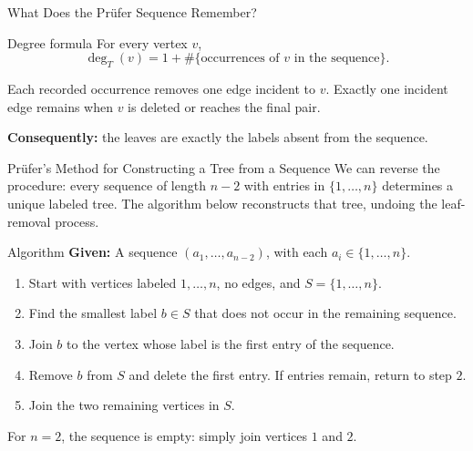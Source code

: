 \documentclass[aspectratio=169,11pt]{beamer}
\begin{document}
\begin{frame}{What Does the Pr\"ufer Sequence Remember?}
\large
\begin{block}{Degree formula}
For every vertex $v$,\[\deg_T(v)=1+\#\{\text{occurrences of }v\text{ in the sequence}\}.\]
\end{block}
Each recorded occurrence removes one edge incident to $v$. Exactly one incident edge remains when $v$ is deleted or reaches the final pair.\par\bigskip\textbf{Consequently:} the leaves are exactly the labels absent from the sequence.
\end{frame}

\begin{frame}{Pr\"ufer's Method for Constructing a Tree from a Sequence}
\normalsize
We can reverse the procedure: every sequence of length $n-2$ with entries in $\{1,\ldots,n\}$ determines a unique labeled tree. The algorithm below reconstructs that tree, undoing the leaf-removal process.
\par\medskip
\begin{block}{Algorithm}
\textbf{Given:} A sequence $(a_1,\ldots,a_{n-2})$, with each $a_i\in\{1,\ldots,n\}$.
\par\smallskip
\begin{enumerate}
\setlength{\itemsep}{0.16cm}
\item Start with vertices labeled $1,\ldots,n$, no edges, and $S=\{1,\ldots,n\}$.
\item Find the smallest label $b\in S$ that does not occur in the remaining sequence.
\item Join $b$ to the vertex whose label is the first entry of the sequence.
\item Remove $b$ from $S$ and delete the first entry. If entries remain, return to step $2$.
\item Join the two remaining vertices in $S$.
\end{enumerate}
\end{block}
\par\smallskip For $n=2$, the sequence is empty: simply join vertices $1$ and $2$.
\end{frame}
\end{document}
